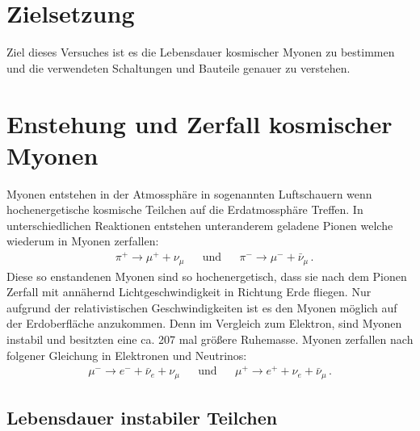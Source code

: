 \section{Zielsetzung}
    Ziel dieses Versuches ist es die Lebensdauer kosmischer Myonen zu bestimmen und die verwendeten Schaltungen und Bauteile genauer zu verstehen.

    \section{Enstehung und Zerfall kosmischer Myonen}
        Myonen entstehen in der Atmossphäre in sogenannten Luftschauern wenn hochenergetische kosmische Teilchen auf die Erdatmossphäre Treffen.
        In unterschiedlichen Reaktionen entstehen unteranderem geladene Pionen welche wiederum in Myonen zerfallen:
        \begin{align}
            &\pi^+ \rightarrow \mu^+ + \nu_\mu && \text{und} && \pi^- \rightarrow \mu^- + \bar{\nu}_\mu \, .
        \end{align}
        Diese so enstandenen Myonen sind so hochenergetisch, dass sie nach dem Pionen Zerfall mit annähernd Lichtgeschwindigkeit in Richtung Erde fliegen.
        Nur aufgrund der relativistischen Geschwindigkeiten ist es den Myonen möglich auf der Erdoberfläche anzukommen. 
        Denn im Vergleich zum Elektron, sind Myonen instabil und besitzten eine ca. 207 mal größere Ruhemasse. 
        Myonen zerfallen nach folgener Gleichung in Elektronen und Neutrinos:
        \begin{align}
            \mu^- \rightarrow e^- + \bar{\nu}_e + \nu_\mu && \text{und} &&  \mu^+ \rightarrow e^+ + \nu_e + \bar{\nu}_\mu \, . 
        \end{align} 

    \subsection{Lebensdauer instabiler Teilchen}

